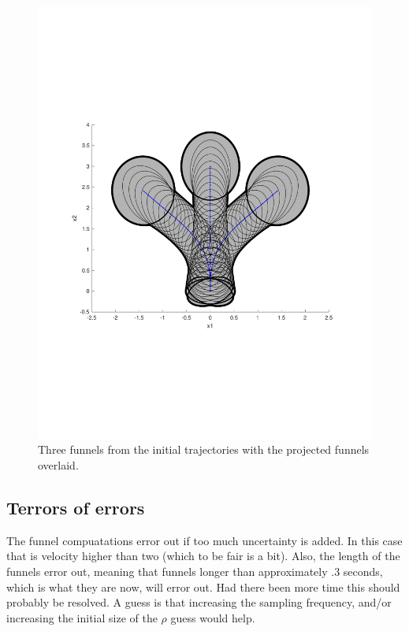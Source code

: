 \begin{figure}
  \centering
  \includegraphics[scale=.5]{figures/experiments/sample-funnel-overlay}
  \caption{Three funnels from the initial trajectories with the projected
    funnels overlaid.}
  \label{fig:sample-funnel-overlay}
\end{figure}

\subsection{Terrors of errors}

The funnel compuatations error out if too much uncertainty is added. In this
case that is velocity higher than two (which to be fair is a bit). Also, the
length of the funnels error out, meaning that funnels longer than approximately
.3 seconds, which is what they are now, will error out. Had there been more time
this should probably be resolved. A guess is that increasing the sampling
frequency, and/or increasing the initial size of the \(\rho\) guess would help.

